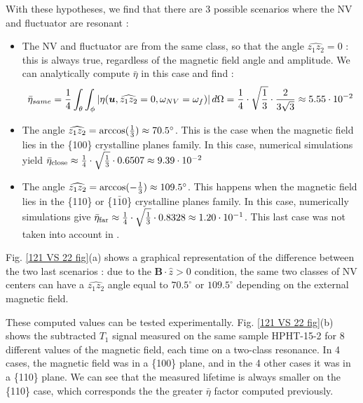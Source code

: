 \documentclass[preprintnumbers,amsmath,amssymb,onecolumn,12pt]{revtex4-2}\usepackage{graphicx}%
\begin{document}
With these hypotheses, we find that there are 3 possible scenarios where the NV and fluctuator are resonant :
\begin{itemize}
\item The NV and fluctuator are from the same class, so that the angle $\widehat{z_1 z_2}=0$ : this is always true, regardless of the magnetic field angle and amplitude. We can analytically compute $\bar \eta$ in this case and find : $$ \bar {\eta}_{same}=\frac{1}{4}  \int_\theta \int_\phi \abs{\eta(\bm u,\widehat{z_1 z_2}=0,\omega_{NV}=\omega_f)}\, d\Omega= \frac{1}{4} \cdot \sqrt{\frac{1}{3}} \cdot \frac{2}{3 \sqrt{3}} \approx 5.55\cdot10^{-2}$$
\item The angle $\widehat{z_1 z_2}=\rm{arccos}(\frac{1}{3})\approx 70.5^\circ$. This is the case when the magnetic field lies in the \{100\} crystalline planes family. In this case, numerical simulations yield $\bar \eta_{\rm close} \approx \frac{1}{4} \cdot \sqrt{\frac{1}{3}} \cdot 0.6507 \approx 9.39\cdot10^{-2}$
\item The angle $\widehat{z_1 z_2}=\rm{arccos}(-\frac{1}{3})\approx 109.5^\circ$. This happens when the magnetic field lies in the \{110\} or \{$1\bar{1}0$\} crystalline planes family. In this case, numerically simulations give $\bar \eta_{\rm far} \approx \frac{1}{4} \cdot \sqrt{\frac{1}{3}} \cdot 0.8328 \approx 1.20\cdot10^{-1}$. This last case was not taken into account in \cite{choi_depolarization_2017}.
\end{itemize}

Fig. \ref{121 VS 22 fig}(a) shows a graphical representation of the difference between the two last scenarios : due to the $\bm{B}\cdot \hat{z} >0$ condition, the same two classes of NV centers can have a $\widehat{z_1 z_2}$ angle equal to $70.5^\circ$ or $109.5^\circ$ depending on the external magnetic field. 

These computed values can be tested experimentally. Fig. \ref{121 VS 22 fig}(b) shows the subtracted $T_1$ signal measured on the same sample HPHT-15-2 for 8 different values of the magnetic field, each time on a two-class resonance. In 4 cases, the magnetic field was in a \{100\} plane, and in the 4 other cases it was in a \{110\} plane. We can see that the measured lifetime is always smaller on the \{110\} case, which corresponds the the greater $\bar \eta$ factor computed previously.
\end{document}
